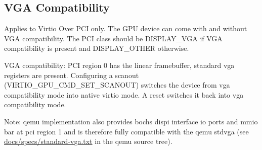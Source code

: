 \subsection{VGA Compatibility}\label{sec:Device Types / GPU Device / VGA Compatibility}

Applies to Virtio Over PCI only.  The GPU device can come with and
without VGA compatibility.  The PCI class should be DISPLAY_VGA if VGA
compatibility is present and DISPLAY_OTHER otherwise.

VGA compatibility: PCI region 0 has the linear framebuffer, standard
vga registers are present.  Configuring a scanout
(VIRTIO_GPU_CMD_SET_SCANOUT) switches the device from vga
compatibility mode into native virtio mode.  A reset switches it back
into vga compatibility mode.

Note: qemu implementation also provides bochs dispi interface io ports
and mmio bar at pci region 1 and is therefore fully compatible with
the qemu stdvga (see \href{https://git.qemu-project.org/?p=qemu.git;a=blob;f=docs/specs/standard-vga.txt;hb=HEAD}{docs/specs/standard-vga.txt} in the qemu source tree).
